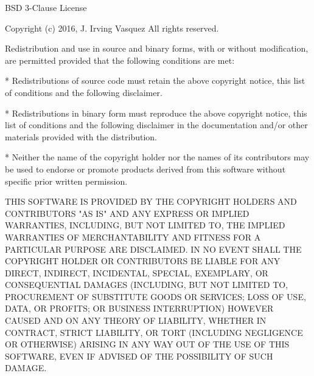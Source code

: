 BSD 3-Clause License

Copyright (c) 2016, J. Irving Vasquez
All rights reserved.

Redistribution and use in source and binary forms, with or without
modification, are permitted provided that the following conditions are met:

* Redistributions of source code must retain the above copyright notice, this
  list of conditions and the following disclaimer.

* Redistributions in binary form must reproduce the above copyright notice,
  this list of conditions and the following disclaimer in the documentation
  and/or other materials provided with the distribution.

* Neither the name of the copyright holder nor the names of its
  contributors may be used to endorse or promote products derived from
  this software without specific prior written permission.

THIS SOFTWARE IS PROVIDED BY THE COPYRIGHT HOLDERS AND CONTRIBUTORS "AS IS"
AND ANY EXPRESS OR IMPLIED WARRANTIES, INCLUDING, BUT NOT LIMITED TO, THE
IMPLIED WARRANTIES OF MERCHANTABILITY AND FITNESS FOR A PARTICULAR PURPOSE ARE
DISCLAIMED. IN NO EVENT SHALL THE COPYRIGHT HOLDER OR CONTRIBUTORS BE LIABLE
FOR ANY DIRECT, INDIRECT, INCIDENTAL, SPECIAL, EXEMPLARY, OR CONSEQUENTIAL
DAMAGES (INCLUDING, BUT NOT LIMITED TO, PROCUREMENT OF SUBSTITUTE GOODS OR
SERVICES; LOSS OF USE, DATA, OR PROFITS; OR BUSINESS INTERRUPTION) HOWEVER
CAUSED AND ON ANY THEORY OF LIABILITY, WHETHER IN CONTRACT, STRICT LIABILITY,
OR TORT (INCLUDING NEGLIGENCE OR OTHERWISE) ARISING IN ANY WAY OUT OF THE USE
OF THIS SOFTWARE, EVEN IF ADVISED OF THE POSSIBILITY OF SUCH DAMAGE.

